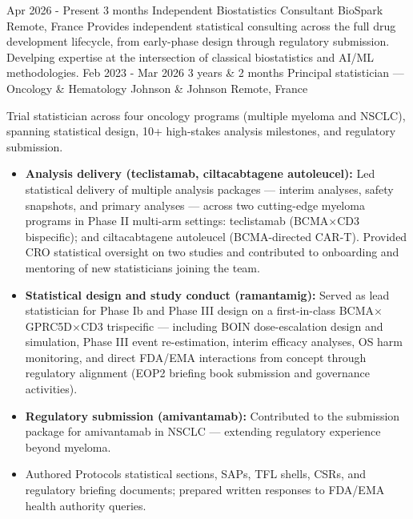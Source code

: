 \vspace*{.2em}
\begin{experiences}
\imageexperience
{Apr 2026 - Present}
{3 months}
{Independent Biostatistics Consultant}
{BioSpark}
{Remote, France}
{}
{\vspace*{-2em}
Provides independent statistical consulting across the full drug development
 lifecycle, from early-phase design through regulatory submission. Develping
 expertise at the intersection of classical biostatistics and AI/ML methodologies.
}
{}
\emptySeparator
\imageexperience
{Feb 2023 - Mar 2026}
{3 years \& 2 months}
{Principal statistician --- Oncology \& Hematology}
{Johnson \& Johnson}
{Remote, France}
{}
{\vspace*{-2em}
Trial statistician across four oncology programs (multiple myeloma and NSCLC),
 spanning statistical design, 10+ high-stakes analysis milestones, and regulatory
  submission.
\begin{itemize}
\item \textbf{Analysis delivery (teclistamab, ciltacabtagene autoleucel):} 
Led statistical delivery of multiple analysis packages --- interim analyses,
 safety snapshots, and primary analyses --- across two cutting-edge myeloma
  programs in Phase II multi-arm settings: teclistamab
   (BCMA$\times$CD3 bispecific); and ciltacabtagene autoleucel
     (BCMA-directed CAR-T). Provided CRO statistical oversight on two studies and contributed to onboarding and mentoring of new statisticians joining the team.
\item \textbf{Statistical design and study conduct (ramantamig):} Served as lead
 statistician for Phase Ib and Phase III design on a first-in-class 
 BCMA$\times$GPRC5D$\times$CD3 trispecific --- including BOIN dose-escalation 
 design and simulation, Phase III event re-estimation, interim efficacy analyses,
  OS harm monitoring, and direct FDA/EMA interactions from concept through
   regulatory alignment (EOP2 briefing book submission and governance activities).
\item \textbf{Regulatory submission (amivantamab):} Contributed to the submission
 package for amivantamab in NSCLC --- extending regulatory experience beyond
  myeloma.
\item Authored Protocols statistical sections, SAPs, TFL shells, CSRs, and regulatory briefing documents; prepared written responses to FDA/EMA health authority queries.

\end{itemize}}
\end{experiences}

